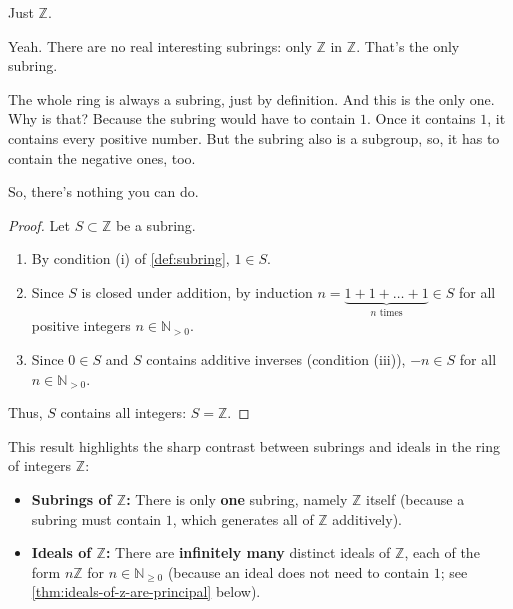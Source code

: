 \begin{student}
Just $\mathbb{Z}$.
\end{student}

\begin{speech}[00:46:53 - 00:47:40]
Yeah. There are no real interesting subrings: only $\mathbb{Z}$ in $\mathbb{Z}$.  That's the only subring.

The whole ring is always a subring, just by definition. And this is the only one. Why is that? Because the subring would have to contain $1$. Once it contains $1$, it contains every positive number. But the subring also is a subgroup, so, it has to contain the negative ones, too.

So, there's nothing you can do.
\end{speech}

\begin{content}

\begin{proof}
Let $S \subset \mathbb{Z}$ be a subring.
\begin{enumerate}[label=\textbf{(\arabic*)}]
    \item By condition (i) of \cref{def:subring}, $1 \in S$.
    \item Since $S$ is closed under addition, by induction $n = \underbrace{1 + 1 + \dots + 1}_{n \text{ times}} \in S$ for all positive integers $n \in \mathbb{N}_{>0}$.
    \item Since $0 \in S$ and $S$ contains additive inverses (condition (iii)), $-n \in S$ for all $n \in \mathbb{N}_{>0}$.
\end{enumerate}
Thus, $S$ contains all integers: $S = \mathbb{Z}$.
\end{proof}

\begin{steps}
This result highlights the sharp contrast between subrings and ideals in the ring of integers $\mathbb{Z}$:
\begin{itemize}
    \item \textbf{Subrings of $\mathbb{Z}$:} There is only \textbf{one} subring, namely $\mathbb{Z}$ itself (because a subring must contain $1$, which generates all of $\mathbb{Z}$ additively).
    \item \textbf{Ideals of $\mathbb{Z}$:} There are \textbf{infinitely many} distinct ideals of $\mathbb{Z}$, each of the form $n\mathbb{Z}$ for $n \in \mathbb{N}_{\ge 0}$ (because an ideal does not need to contain $1$; see \cref{thm:ideals-of-z-are-principal} below).
\end{itemize}
\end{steps}
\end{content}

